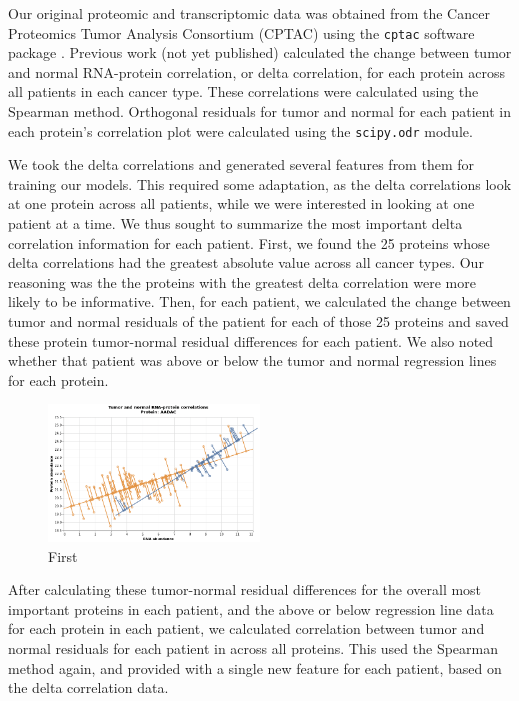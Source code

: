 \documentclass{article}
\begin{document}
Our original proteomic and transcriptomic data was obtained from the Cancer Proteomics Tumor Analysis Consortium (CPTAC) \cite{rodriguez_next_2021} using the \texttt{cptac} software package \cite{lindgren_simplified_2021}. Previous work (not yet published) calculated the change between tumor and normal RNA-protein correlation, or delta correlation, for each protein across all patients in each cancer type. These correlations were calculated using the Spearman method. Orthogonal residuals for tumor and normal for each patient in each protein's correlation plot were calculated using the \texttt{scipy.odr} module.

We took the delta correlations and generated several features from them for training our models. This required some adaptation, as the delta correlations look at one protein across all patients, while we were interested in looking at one patient at a time. We thus sought to summarize the most important delta correlation information for each patient. First, we found the 25 proteins whose delta correlations had the greatest absolute value across all cancer types. Our reasoning was the the proteins with the greatest delta correlation were more likely to be informative. Then, for each patient, we calculated the change between tumor and normal residuals of the patient for each of those 25 proteins and saved these protein tumor-normal residual differences for each patient. We also noted whether that patient was above or below the tumor and normal regression lines for each protein.

\begin{figure}[H]
    \centering
    \includegraphics[width=0.5\textwidth]{deltacorr}
    \caption{First}
    \label{fig:deltacorr}
\end{figure}

After calculating these tumor-normal residual differences for the overall most important proteins in each patient, and the above or below regression line data for each protein in each patient, we calculated correlation between tumor and normal residuals for each patient in across all proteins. This used the Spearman method again, and provided with a single new feature for each patient, based on the delta correlation data.
\end{document}
